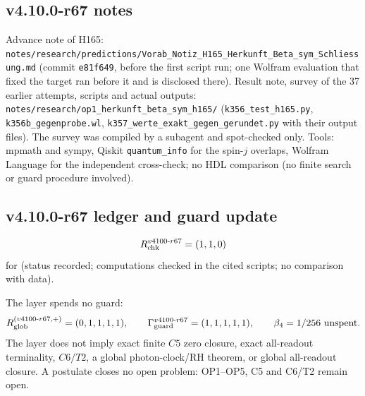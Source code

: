\subsection*{v4.10.0-r67 notes}
\label{subsec:v4100-r67-notes}

{\raggedright
Advance note of H165: \texttt{notes/\allowbreak research/\allowbreak predictions/\allowbreak Vorab\_\allowbreak Notiz\_\allowbreak H165\_\allowbreak Herkunft\_\allowbreak Beta\_\allowbreak sym\_\allowbreak Schliessung.md}
(commit \texttt{e81f649}, before the first script run; one Wolfram evaluation that fixed the target ran before it and is disclosed there).
Result note, survey of the 37 earlier attempts, scripts and actual outputs:
\texttt{notes/\allowbreak research/\allowbreak op1\_\allowbreak herkunft\_\allowbreak beta\_\allowbreak sym\_\allowbreak h165/}
(\texttt{k356\_\allowbreak test\_\allowbreak h165.py}, \texttt{k356b\_\allowbreak gegenprobe.wl}, \texttt{k357\_\allowbreak werte\_\allowbreak exakt\_\allowbreak gegen\_\allowbreak gerundet.py} with their output files).
The survey was compiled by a subagent and spot-checked only.
Tools: mpmath and sympy, Qiskit \texttt{quantum\_info} for the spin-\(j\) overlaps, Wolfram Language for the independent cross-check; no HDL
comparison (no finite search or guard procedure involved).
\par}

\subsection*{v4.10.0-r67 ledger and guard update}
\label{subsec:v4100-r67-ledger-guard}

\[
R_{\rm chk}^{v4100\text{-}r67}=(1,1,0)
\]
for (status recorded; computations checked in the cited scripts; no comparison with data).

The layer spends no guard:
\[
R_{\rm glob}^{(v4100\text{-}r67,+)}=(0,1,1,1,1),
\qquad
\Gamma_{\rm guard}^{v4100\text{-}r67}=(1,1,1,1,1),
\qquad
\beta_4=1/256\ \text{unspent}.
\]
The layer does not imply exact finite \(C5\) zero closure, exact all-readout terminality, \(C6/T2\), a global photon-clock/RH theorem,
or global all-readout closure.  A postulate closes no open problem: OP1--OP5, C5 and C6/T2 remain open.
